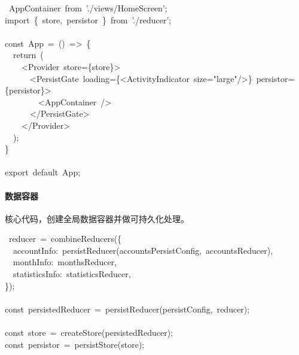 \documentclass{article}
\begin{document}
\begin{mdpre}%
~AppContainer~{from}~{'}{./views/HomeScreen}{'};\\
{import}~\{~store,~persistor~\}~{from}~{'}{./reducer}{'};\\
\\
{const}~App~=~()~=\textgreater{}~\{\\
~~{return}~(\\
~~~~\textless{}Provider~store=\{store\}\textgreater{}\\
~~~~~~\textless{}PersistGate~loading=\{\textless{}ActivityIndicator~size={"}{large}{"}/\textgreater{}\}~persistor=\{persistor\}\textgreater{}\\
~~~~~~~~\textless{}AppContainer~/\textgreater{}\\
~~~~~~\textless{}/PersistGate\textgreater{}\\
~~~~\textless{}/Provider\textgreater{}\\
~~);\\
\}\\
\\
{export}~{default}~App;%
\end{mdpre}
\paragraph{数据容器}\label{section}%

\noindent{}核心代码，创建全局数据容器并做可持久化处理。%
\begin{mdpre}%
~reducer~=~combineReducers(\{\\
~~accountInfo:~persistReducer(accountsPersistConfig,~accountsReducer),\\
~~monthInfo:~monthsReducer,\\
~~statisticsInfo:~statisticsReducer,\\
\});\\
\\
{const}~persistedReducer~=~persistReducer(persistConfig,~reducer);\\
\\
{const}~store~=~createStore(persistedReducer);\\
{const}~persistor~=~persistStore(store);%
\end{mdpre}
\end{document}
